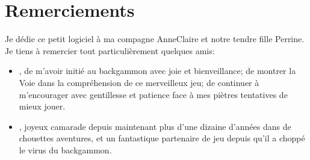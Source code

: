\documentclass[letterpaper,10pt,french]{sphinxmanual}
\begin{document}
\chapter{Remerciements}
\label{\detokenize{index:remerciements}}
\sphinxAtStartPar
Je dédie ce petit logiciel à ma compagne Anne\sphinxhyphen{}Claire et notre tendre
fille Perrine. Je tiens à remercier tout particulièrement quelques amis:
\begin{itemize}
\item {} 
\sphinxAtStartPar
{}, de m’avoir initié au backgammon avec joie et
bienveillance; de montrer la Voie dans la compréhension de ce
merveilleux jeu; de continuer à m’encourager avec gentillesse et
patience face à mes piètres tentatives de mieux jouer.

\item {} 
\sphinxAtStartPar
{}, joyeux camarade depuis maintenant plus d’une dizaine
d’années dans de chouettes aventures, et un fantastique partenaire de jeu
depuis qu’il a choppé le virus du backgammon.

\end{itemize}



\renewcommand{\indexname}{Index}
\printindex
\end{document}
